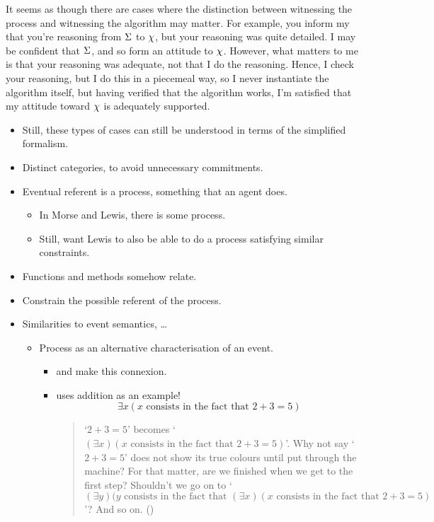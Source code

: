 \documentclass[10pt]{article}
\begin{document}
\begin{note}
  It seems as though there are cases where the distinction between witnessing the process and witnessing the algorithm may matter.
  For example, you inform my that you're reasoning from \(\Sigma\) to \(\chi\), but your reasoning was quite detailed.
  I may be confident that \(\Sigma\), and so form an attitude to \(\chi\).
  However, what matters to me is that your reasoning was adequate, not that I do the reasoning.
  Hence, I check your reasoning, but I do this in a piecemeal way, so I never instantiate the algorithm itself, but having verified that the algorithm works, I'm satisfied that my attitude toward \(\chi\) is adequately supported.
  \begin{itemize}
  \item Still, these types of cases can still be understood in terms of the simplified formalism.
  \end{itemize}
\end{note}

\begin{itemize}
\item Distinct categories, to avoid unnecessary commitments.
\item Eventual referent is a process, something that an agent does.
  \begin{itemize}
  \item In Morse and Lewis, there is some process.
  \item Still, want Lewis to also be able to do a process satisfying similar constraints.
  \end{itemize}
\item Functions and methods somehow relate.
\item Constrain the possible referent of the process.
\item Similarities to event semantics, \dots
  \begin{itemize}
  \item Process as an alternative characterisation of an event.
    \begin{itemize}
    \item \textcite{Koenig:2016aa} and \textcite{Link:1997aa} make this connexion.
    \item \textcite[117]{Davidson:2001aa} uses addition as an example!
      \[\exists x(x \text{ consists in the fact that } 2 + 3 = 5)\]

      \begin{quote}
        `\(2 + 3 = 5\)' becomes `\((\exists x) (x \text{ consists in the fact that } 2 + 3 = 5)\)'.
        Why not say `\(2 + 3 = 5\)' does not show its true colours until put through the machine?
        For that matter, are we finished when we get to the first step?
        Shouldn't we go on to `\((\exists y) (y \text{ consists in the fact that } (\exists x) (x \text{ consists in the fact that } 2 + 3 = 5)\)'?
        And so on.\nolinebreak
        \mbox{}\hfill\mbox{(\citeyear[117]{Davidson:2001aa})}
      \end{quote}
    \end{itemize}
  \end{itemize}
\end{itemize}
\end{document}
